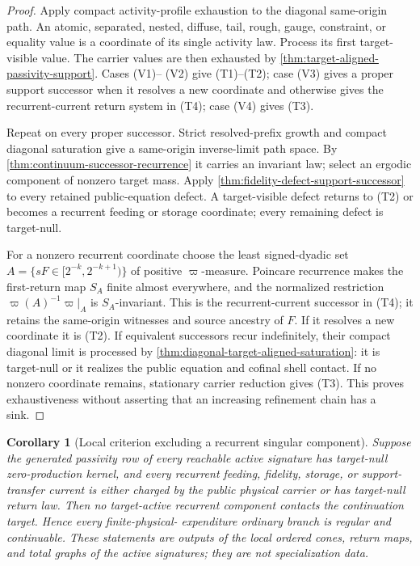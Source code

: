 \documentclass[11pt]{article}
\numberwithin{section}{part}
\theoremstyle{plain}
\newtheorem{corollary}[corollary]{Corollary}
\theoremstyle{definition}
\theoremstyle{remark}
\begin{document}
\begin{proof}
Apply compact activity-profile exhaustion to the diagonal same-origin path.
An atomic, separated, nested, diffuse, tail, rough, gauge, constraint, or
equality value is a coordinate of its single activity law.  Process its first
target-visible value.  The carrier values are then exhausted by
\cref{thm:target-aligned-passivity-support}.  Cases \textup{(V1)}--
\textup{(V2)} give \textup{(T1)}--\textup{(T2)}; case \textup{(V3)} gives a
proper support successor when it resolves a new coordinate and otherwise
gives the recurrent-current return system in \textup{(T4)}; case
\textup{(V4)} gives \textup{(T3)}.

Repeat on every proper successor.  Strict resolved-prefix growth and compact
diagonal saturation give a same-origin inverse-limit path space.  By
\cref{thm:continuum-successor-recurrence} it carries an invariant law; select
an ergodic component of nonzero target mass.  Apply
\cref{thm:fidelity-defect-support-successor} to every retained public-equation
defect.  A target-visible defect returns to \textup{(T2)} or becomes a
recurrent feeding or storage coordinate; every remaining defect is
target-null.

For a nonzero recurrent coordinate choose the least signed-dyadic set
\(A=\{sF\in[2^{-k},2^{-k+1})\}\) of positive \(\varpi\)-measure.  Poincare
recurrence makes the first-return map \(S_A\) finite almost everywhere, and
the normalized restriction \(\varpi(A)^{-1}\varpi|_A\) is \(S_A\)-invariant.
This is the recurrent-current successor in \textup{(T4)}; it retains the
same-origin witnesses and source ancestry of \(F\).  If it resolves a new
coordinate it is \textup{(T2)}.  If equivalent successors recur indefinitely,
their compact diagonal limit is processed by
\cref{thm:diagonal-target-aligned-saturation}: it is target-null or it
realizes the public equation and cofinal shell contact.  If no nonzero
coordinate remains, stationary carrier reduction gives \textup{(T3)}.
This proves exhaustiveness without asserting that an increasing refinement
chain has a sink.
\end{proof}

\begin{corollary}[Local criterion excluding a recurrent singular component]
\label{cor:terminal-atom-regularity-criterion}
Suppose the generated passivity row of every reachable active signature has
target-null zero-production kernel, and every recurrent feeding, fidelity,
storage, or support-transfer current is either charged by the public physical
carrier or has target-null return law.  Then no target-active recurrent
component contacts the continuation target.  Hence every finite-physical-
expenditure ordinary branch is regular and continuable.  These statements
are outputs of the local ordered cones, return maps, and total graphs of the
active signatures; they are not specialization data.
\end{corollary}
\end{document}
